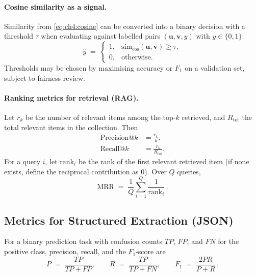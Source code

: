 \paragraph{Cosine similarity as a signal.}
Similarity from \autoref{eq:ch4:cosine} can be converted into a binary decision with a threshold $\tau$ when evaluating against labelled pairs $(\mathbf{u},\mathbf{v},y)$ with $y\in\{0,1\}$:
\begin{equation}
    \hat{y} \;=\;
    \begin{cases}
        1, & \mathrm{sim}_{\cos}(\mathbf{u}, \mathbf{v}) \ge \tau,\\[0.35em]
        0, & \mathrm{otherwise}.
    \end{cases}
    \label{eq:ch4:cosine_threshold}
\end{equation}
Thresholds may be chosen by maximising accuracy or $F_1$ on a validation set, subject to fairness review.

\paragraph{Ranking metrics for retrieval (RAG).}
Let $r_k$ be the number of relevant items among the top-$k$ retrieved, and $R_{\mathrm{tot}}$ the total relevant items in the collection. Then
\begin{align}
    \mathrm{Precision@}k &= \frac{r_k}{k}, \\
    \mathrm{Recall@}k &= \frac{r_k}{R_{\mathrm{tot}}}.
\end{align}
For a query $i$, let $\mathrm{rank}_i$ be the rank of the first relevant retrieved item (if none exists, define the reciprocal contribution as $0$). Over $Q$ queries,
\begin{equation}
    \mathrm{MRR}
    \;=\;
    \frac{1}{Q}\sum_{i=1}^{Q}\frac{1}{\mathrm{rank}_i}\,.
    \label{eq:ch4:mrr}
\end{equation}

\subsection{Metrics for Structured Extraction (JSON)}
\label{sec:ch4:metrics_extraction}

For a binary prediction task with confusion counts $TP$, $FP$, and $FN$ for the positive class, precision, recall, and the $F_1$-score are
\begin{equation}
    P \;=\; \frac{TP}{TP+FP},
    \qquad
    R \;=\; \frac{TP}{TP+FN},
    \qquad
    F_1 \;=\; \frac{2PR}{P+R}\,.
    \label{eq:ch4:prf1}
\end{equation}

